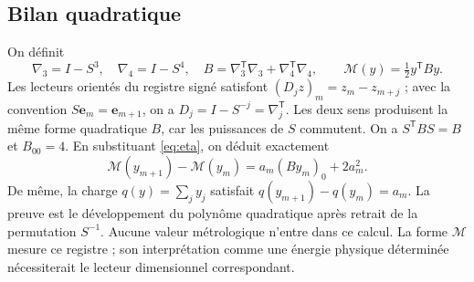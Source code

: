 \subsection{Bilan quadratique}
On définit
\[
\nabla_3=I-S^3,\quad \nabla_4=I-S^4,\quad
B=\nabla_3^{\mathsf T}\nabla_3+\nabla_4^{\mathsf T}\nabla_4,\qquad
\mathcal M(y)=\tfrac12 y^{\mathsf T}By.
\]
Les lecteurs orientés du registre signé satisfont
$(D_jz)_m=z_m-z_{m+j}$ ; avec la convention
$S\mathbf e_m=\mathbf e_{m+1}$, on a
$D_j=I-S^{-j}=\nabla_j^{\mathsf T}$. Les deux sens produisent la même
forme quadratique $B$, car les puissances de $S$ commutent.
On a $S^{\mathsf T}BS=B$ et $B_{00}=4$. En substituant
\eqref{eq:eta}, on déduit exactement
\begin{equation}
\mathcal M(y_{m+1})-\mathcal M(y_m)
=a_m(By_m)_0+2a_m^2.
\label{mem:balance}
\end{equation}
De même, la charge $q(y)=\sum_jy_j$ satisfait
$q(y_{m+1})-q(y_m)=a_m$.
La preuve est le développement du polynôme quadratique après retrait de la
permutation $S^{-1}$. Aucune valeur métrologique n’entre dans ce calcul.
La forme $\mathcal M$ mesure ce registre ; son interprétation comme une
énergie physique déterminée nécessiterait le lecteur dimensionnel correspondant.




